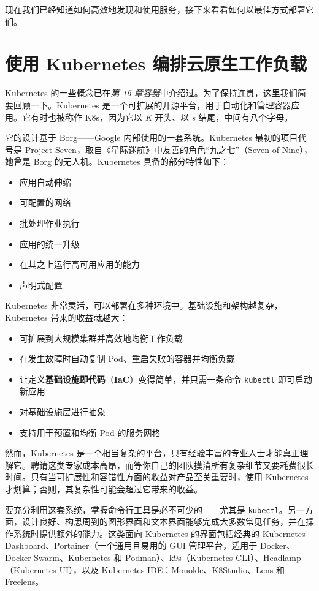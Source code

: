 现在我们已经知道如何高效地发现和使用服务，接下来看看如何以最佳方式部署它们。

\section{使用 Kubernetes 编排云原生工作负载}

\label{idx:1942}
Kubernetes 的一些概念已在\emph{第 16 章}\emph{容器}中介绍过。为了保持连贯，这里我们简要回顾一下。Kubernetes 是一个可扩展的开源平台，用于自动化和管理容器应用。它有时也被称作 K8s，因为它以 \emph{K} 开头、以 \emph{s} 结尾，中间有八个字母。

它的设计基于 Borg——Google 内部使用的一套系统。Kubernetes 最初的项目代号是 Project Seven，取自《星际迷航》中友善的角色“九之七”（Seven of Nine），她曾是 Borg 的无人机。Kubernetes 具备的部分特性如下：

\begin{itemize}
\item 应用自动伸缩
\item 可配置的网络
\item 批处理作业执行
\item 应用的统一升级
\item 在其之上运行高可用应用的能力
\item 声明式配置
\end{itemize}

\label{idx:1943}
Kubernetes 非常灵活，可以部署在多种环境中。基础设施和架构越复杂，Kubernetes 带来的收益就越大：

\begin{itemize}
\item 可扩展到大规模集群并高效地均衡工作负载
\item 在发生故障时自动复制 Pod、重启失败的容器并均衡负载
\label{idx:1944}
\item 让定义\textbf{基础设施即代码}（\textbf{IaC}）变得简单，并只需一条命令 \texttt{kubectl} 即可启动新应用
\item 对基础设施层进行抽象
\item 支持用于预置和均衡 Pod 的服务网格
\end{itemize}

然而，Kubernetes 是一个相当复杂的平台，只有经验丰富的专业人士才能真正理解它。聘请这类专家成本高昂，而等你自己的团队摸清所有复杂细节又要耗费很长时间。只有当可扩展性和容错性方面的收益对产品至关重要时，使用 Kubernetes 才划算；否则，其复杂性可能会超过它带来的收益。

要充分利用这套系统，掌握命令行工具是必不可少的——尤其是 \texttt{kubectl}。另一方面，设计良好、构思周到的图形界面和文本界面能够完成大多数常见任务，并在操作系统时提供额外的能力。这类面向 Kubernetes 的界面包括经典的 Kubernetes Dashboard、Portainer（一个通用且易用的 GUI 管理平台，适用于 Docker、Docker Swarm、Kubernetes 和 Podman）、k9s（Kubernetes CLI）、Headlamp（Kubernetes UI），以及 Kubernetes IDE：Monokle、K8Studio、Lens 和 Freelens。

